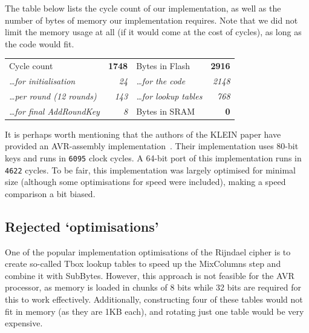 \documentclass[a4paper]{article}
\begin{document}
The table below lists the cycle count of our implementation, as well as the number of bytes of memory our implementation requires. Note that we did not limit the memory usage at all (if it would come at the cost of cycles), as long as the code would fit.

\vspace{0.5em}
\begin{center}
	\begin{tabular}{l r | l r}
		\hline
		Cycle count & \textbf{1748} & Bytes in Flash & \textbf{2916} \\
		\hspace{1em} \emph{\dots for initialisation} & \emph{24} & \hspace{1em} \emph{\dots for the code} & \emph{2148} \\
		\hspace{1em} \emph{\dots per round (12 rounds)} & \emph{143} & \hspace{1em} \emph{\dots for lookup tables} & \emph{768} \\
		\cline{3-4}
		\hspace{1em} \emph{\dots for final AddRoundKey} & \emph{8} & Bytes in SRAM & \textbf{0} \\
		\hline
	\end{tabular}
\end{center}
\vspace{0.5em}

It is perhaps worth mentioning that the authors of the KLEIN paper have provided an AVR-assembly implementation~\cite{eisenbarth2012compact}. Their implementation uses 80-bit keys and runs in \texttt{6095} clock cycles. A 64-bit port of this implementation runs in \texttt{4622} cycles. To be fair, this implementation was largely optimised for minimal size (although some optimisations for speed were included), making a speed comparison a bit biased.

\subsection*{Rejected `optimisations'}

One of the popular implementation optimisations of the Rijndael cipher is to create so-called Tbox lookup tables to speed up the MixColumns step and combine it with SubBytes. However, this approach is not feasible for the AVR processor, as memory is loaded in chunks of 8 bits while 32 bits are required for this to work effectively. Additionally, constructing four of these tables would not fit in memory (as they are 1KB each), and rotating just one table would be very expensive.
\end{document}
